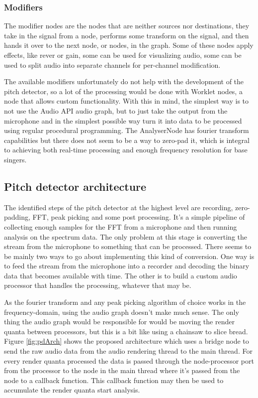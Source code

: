 \subsubsection{Modifiers} 
The modifier nodes are the nodes that are neither sources nor destinations, they take in the signal from a node, performs some transform on the signal, and then hands it over to the next node, or nodes, in the graph. Some of these nodes apply effects, like rever or gain, some can be used for visualizing audio, some can be used to split audio into separate channels for per-channel modification.

The available modifiers unfortunately do not help with the development of the pitch detector, so a lot of the processing would be done with Worklet nodes, a node that allows custom functionality. With this in mind, the simplest way is to not use the Audio API audio graph, but to just take the output from the microphone and in the simplest possible way turn it into data to be processed using regular procedural programming. The AnalyserNode has fourier transform capabilities but there does not seem to be a way to zero-pad it, which is integral to achieving both real-time processing and enough frequency resolution for base singers. 

\subsection{Pitch detector architecture}
The identified steps of the pitch detector at the highest level are recording, zero-padding, FFT, peak picking and some post processing. It's a simple pipeline of collecting enough samples for the FFT from a microphone and then running analysis on the spectrum data. The only problem at this stage is converting the stream from the microphone to something that can be processed. There seems to be mainly two ways to go about implementing this kind of conversion. One way is to feed the stream from the microphone into a recorder and decoding the binary data that becomes available with time. The other is to build a custom audio processor that handles the processing, whatever that may be. 

As the fourier transform and any peak picking algorithm of choice works in the frequency-domain, using the audio graph doesn't make much sense. The only thing the audio graph would be responsible for would be moving the render quanta between processors, but this is a bit like using a chainsaw to slice bread. Figure \ref{fig:pdArch} shows the proposed architecture which uses a bridge node to send the raw audio data from the audio rendering thread to the main thread. For every render quanta processed the data is passed through the node-processor port from the processor to the node in the main thread where it's passed from the node to a callback function. This callback function may then be used to accumulate the render quanta start analysis.

